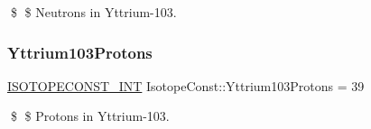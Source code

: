 \$ \$ Neutrons in Yttrium-\/103. \mbox{\label{group___isotope_const-_yttrium-_y103_gaff1ceffebcb69b86d9ccd34939bda33b}} 
\subsubsection{\texorpdfstring{Yttrium103\+Protons}{Yttrium103Protons}}
{\footnotesize\ttfamily \mbox{\hyperlink{group___isotope_const-_macros_ga5f18360b3e99483a35c32d789e62621c}{I\+S\+O\+T\+O\+P\+E\+C\+O\+N\+S\+T\+\_\+\+I\+NT}} Isotope\+Const\+::\+Yttrium103\+Protons = 39}

\$ \$ Protons in Yttrium-\/103. 